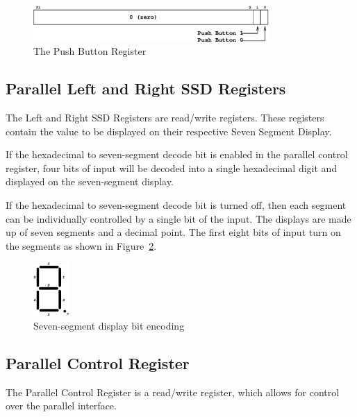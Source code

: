 \documentclass[a4paper,10pt]{article}
\begin{document}
\begin{figure}[h]
\begin{center}
\includegraphics[width=0.8\textwidth]{button_reg.eps}
\caption{The Push Button Register}
\label{button_reg_pic}
\end{center}
\end{figure}

\subsection{Parallel Left and Right SSD Registers}

The Left and Right SSD Registers are read/write registers. These
registers contain the value to be displayed on their respective Seven
Segment Display. 

If the hexadecimal to seven-segment decode bit is enabled in the
parallel control register, four bits of input will be decoded into a
single hexadecimal digit and displayed on the seven-segment display.

If the hexadecimal to seven-segment decode bit is turned off, then
each segment can be individually controlled by a single bit of the
input. The displays are made up of seven segments and a decimal point.
The first eight bits of input turn on the segments as shown in
Figure~\ref{fig:ssd}.

\begin{figure}[h]
\begin{center}
\includegraphics[width=0.12\textwidth]{ssd.eps}
\caption{Seven-segment display bit encoding}
\label{fig:ssd}
\end{center}
\end{figure}

\subsection{Parallel Control Register}

The Parallel Control Register is a read/write register, which allows
for control over the parallel interface.
\end{document}
